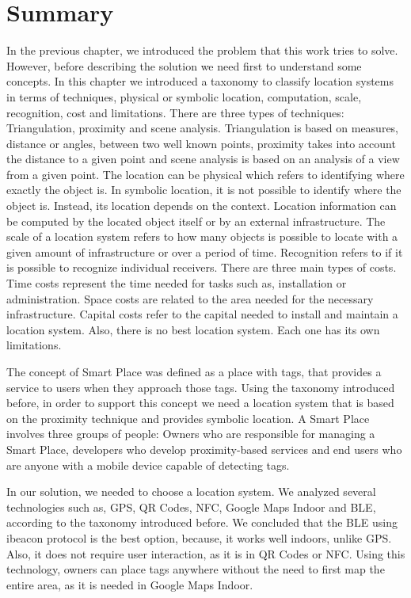 \section{Summary}
\label{sec:background_summary}
In the previous chapter, we introduced the problem that this work tries to solve.
However, before describing the solution we need first to understand some concepts.
In this chapter we introduced a taxonomy to classify location systems in terms of techniques, physical or symbolic location, computation, scale, recognition, cost and limitations.
There are three types of techniques: Triangulation, proximity and scene analysis.
Triangulation is based on measures, distance or angles, between two well known points, proximity takes into account the distance to a given point and scene analysis is based on an analysis of a view from a given point.
The location can be physical which refers to identifying where exactly the object is.
In symbolic location, it is not possible to identify where the object is. Instead, its location depends on the context.
Location information can be computed by the located object itself or by an external infrastructure.
The scale of a location system refers to how many objects is possible to locate with a given amount of infrastructure or over a period of time.
Recognition refers to if it is possible to recognize individual receivers.
There are three main types of costs.
Time costs represent the time needed for tasks such as, installation or administration.
Space costs are related to the area needed for the necessary infrastructure. Capital costs refer to the capital needed to install and maintain a location system.
Also, there is no best location system. Each one has its own limitations.

The concept of Smart Place was defined as a place with tags, that provides a service to users when they approach those tags.
Using the taxonomy introduced before, in order to support this concept we need a location system that is based on the proximity technique and provides symbolic location.
A Smart Place involves three groups of people: Owners who are responsible for managing a Smart Place, developers who develop proximity-based services and end users who are anyone with a mobile device capable of detecting tags.

In our solution, we needed to choose a location system.
We analyzed several technologies such as, \gls{GPS}, \gls{QR} Codes, \gls{NFC}, Google Maps Indoor and \gls{BLE}, according to the taxonomy introduced before.
We concluded that the \gls{BLE} using ibeacon protocol is the best option, because, it works well indoors, unlike \gls{GPS}.
Also, it does not require user interaction, as it is in \gls{QR} Codes or \gls{NFC}.
Using this technology, owners can place tags anywhere without the need to first map the entire area, as it is needed in Google Maps Indoor.
